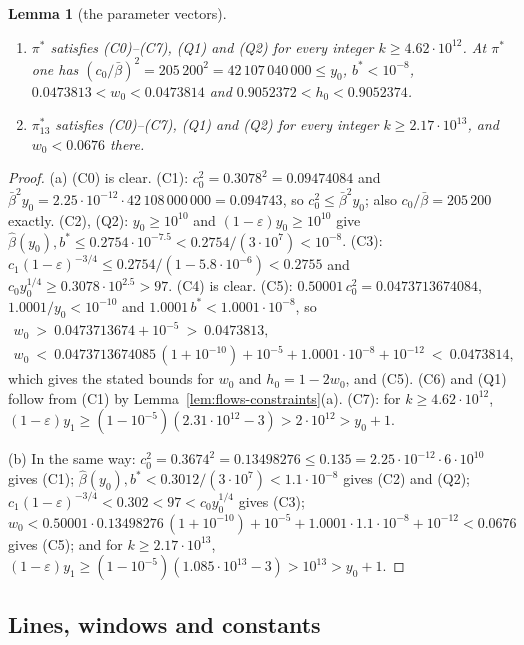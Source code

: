 \documentclass[11pt]{amsart}
\newtheorem{lemma}[theorem]{Lemma}
\theoremstyle{definition}
\theoremstyle{remark}
\numberwithin{equation}{section}
\begin{document}
\begin{lemma}[the parameter vectors]\label{lem:flows-pistar}
\begin{enumerate}[label=(\alph*)]
\item $\pi^*$ satisfies \textup{(C0)--(C7)}, \textup{(Q1)} and \textup{(Q2)} for every integer $k\ge4.62\cdot10^{12}$.
At $\pi^*$ one has $(c_0/\bar\beta)^2=205\,200^2=42\,107\,040\,000\le y_0$, $b^*<10^{-8}$, $0.0473813<w_0<0.0473814$ and
$0.9052372<h_0<0.9052374$.
\item $\pi^*_{13}$ satisfies \textup{(C0)--(C7)}, \textup{(Q1)} and \textup{(Q2)} for every integer
$k\ge2.17\cdot10^{13}$, and $w_0<0.0676$ there.
\end{enumerate}
\end{lemma}

\begin{proof}
(a) (C0) is clear. (C1): $c_0^2=0.3078^2=0.09474084$ and $\bar\beta^2y_0=2.25\cdot10^{-12}\cdot42\,108\,000\,000=0.094743$, so
$c_0^2\le\bar\beta^2y_0$; also $c_0/\bar\beta=205\,200$ exactly. (C2), (Q2): $y_0\ge10^{10}$ and
$(1-\varepsilon)y_0\ge10^{10}$ give $\hat\beta(y_0),b^*\le0.2754\cdot10^{-7.5}<0.2754/(3\cdot10^7)<10^{-8}$. (C3):
$c_1(1-\varepsilon)^{-3/4}\le0.2754/(1-5.8\cdot10^{-6})<0.2755$ and $c_0y_0^{1/4}\ge0.3078\cdot10^{2.5}>97$. (C4) is
clear. (C5): $0.50001\,c_0^2=0.0473713674084$, $1.0001/y_0<10^{-10}$ and $1.0001\,b^*<1.0001\cdot10^{-8}$, so
\begin{gather*}
w_0\ >\ 0.0473713674+10^{-5}\ >\ 0.0473813,\\
w_0\ <\ 0.0473713674085\,(1+10^{-10})+10^{-5}+1.0001\cdot10^{-8}+10^{-12}\ <\ 0.0473814,
\end{gather*}
which gives the stated bounds for $w_0$ and $h_0=1-2w_0$, and (C5). (C6) and (Q1) follow from (C1) by
Lemma~\ref{lem:flows-constraints}(a). (C7): for $k\ge4.62\cdot10^{12}$,
$(1-\varepsilon)y_1\ge(1-10^{-5})(2.31\cdot10^{12}-3)>2\cdot10^{12}>y_0+1$.

(b) In the same way: $c_0^2=0.3674^2=0.13498276\le0.135=2.25\cdot10^{-12}\cdot6\cdot10^{10}$ gives (C1);
$\hat\beta(y_0),b^*<0.3012/(3\cdot10^7)<1.1\cdot10^{-8}$ gives (C2) and (Q2); $c_1(1-\varepsilon)^{-3/4}<0.302<97<c_0y_0^{1/4}$
gives (C3); $w_0<0.50001\cdot0.13498276\,(1+10^{-10})+10^{-5}+1.0001\cdot1.1\cdot10^{-8}+10^{-12}<0.0676$ gives (C5); and for
$k\ge2.17\cdot10^{13}$, $(1-\varepsilon)y_1\ge(1-10^{-5})(1.085\cdot10^{13}-3)>10^{13}>y_0+1$.
\end{proof}

\subsection{Lines, windows and constants}\label{ssec:flows-lines}
\end{document}
